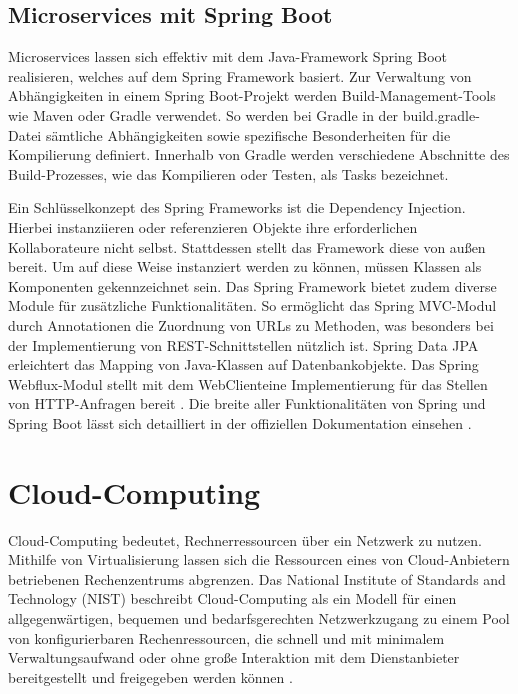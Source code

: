 {\subsection{Microservices mit Spring Boot}

Microservices lassen sich effektiv mit dem Java-Framework Spring Boot realisieren, welches auf dem Spring Framework basiert. Zur Verwaltung von Abhängigkeiten in einem Spring Boot-Projekt werden Build-Management-Tools wie Maven oder Gradle verwendet. So werden bei Gradle in der build.gradle-Datei sämtliche Abhängigkeiten sowie spezifische Besonderheiten für die Kompilierung definiert. Innerhalb von Gradle werden verschiedene Abschnitte des Build-Prozesses, wie das Kompilieren oder Testen, als Tasks bezeichnet.

Ein Schlüsselkonzept des Spring Frameworks ist die Dependency Injection. Hierbei instanziieren oder referenzieren Objekte ihre erforderlichen Kollaborateure nicht selbst. Stattdessen stellt das Framework diese von außen bereit. Um auf diese Weise instanziert werden zu können, müssen Klassen als Komponenten gekennzeichnet sein. Das Spring Framework bietet zudem diverse Module für zusätzliche Funktionalitäten. So ermöglicht das Spring MVC-Modul durch Annotationen die Zuordnung von URLs zu Methoden, was besonders bei der Implementierung von REST-Schnittstellen nützlich ist. Spring Data JPA erleichtert das Mapping von Java-Klassen auf Datenbankobjekte. Das Spring Webflux-Modul stellt mit dem \glqq WebClient\grqq eine Implementierung für das Stellen von HTTP-Anfragen bereit \cite[S.30-39,S.54-58, S.130-139, S.220-227, S.279-281]{simons}. Die breite aller Funktionalitäten von Spring und Spring Boot lässt sich detailliert in der offiziellen Dokumentation einsehen \cite{spring} \cite{springboot}.



%
%

\pagebreak 
\section{Cloud-Computing}

Cloud-Computing bedeutet, Rechnerressourcen über ein Netzwerk zu nutzen. Mithilfe von Virtualisierung lassen sich die Ressourcen eines von Cloud-Anbietern betriebenen Rechenzentrums abgrenzen. Das National Institute of Standards and Technology (NIST) beschreibt Cloud-Computing als ein Modell für einen allgegenwärtigen, bequemen und bedarfsgerechten Netzwerkzugang zu einem Pool von konfigurierbaren Rechenressourcen, die schnell und mit minimalem Verwaltungsaufwand oder ohne große Interaktion mit dem Dienstanbieter bereitgestellt und freigegeben werden können \cite[S. 20]{stender} \cite[S.19-22]{riti} \cite{nist}.

}
